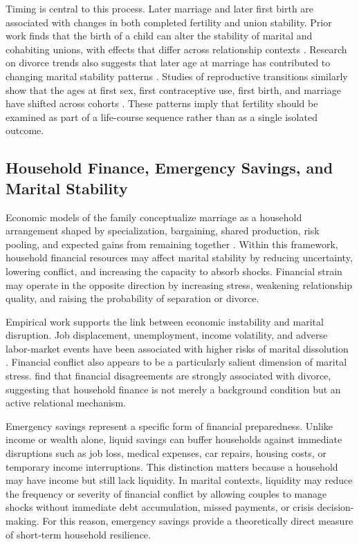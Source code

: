\documentclass[12pt]{article}
\begin{document}
Timing is central to this process. Later marriage and later first birth are associated with changes in both completed fertility and union stability. Prior work finds that the birth of a child can alter the stability of marital and cohabiting unions, with effects that differ across relationship contexts \citep{musick2015}. Research on divorce trends also suggests that later age at marriage has contributed to changing marital stability patterns \citep{rotz2016}. Studies of reproductive transitions similarly show that the ages at first sex, first contraceptive use, first birth, and marriage have shifted across cohorts \citep{finer2014}. These patterns imply that fertility should be examined as part of a life-course sequence rather than as a single isolated outcome.

\subsection{Household Finance, Emergency Savings, and Marital Stability}

Economic models of the family conceptualize marriage as a household arrangement shaped by specialization, bargaining, shared production, risk pooling, and expected gains from remaining together \citep{becker1981}. Within this framework, household financial resources may affect marital stability by reducing uncertainty, lowering conflict, and increasing the capacity to absorb shocks. Financial strain may operate in the opposite direction by increasing stress, weakening relationship quality, and raising the probability of separation or divorce.

Empirical work supports the link between economic instability and marital disruption. Job displacement, unemployment, income volatility, and adverse labor-market events have been associated with higher risks of marital dissolution \citep{charles2004,hansen2005,nunley2010,keldenich2022}. Financial conflict also appears to be a particularly salient dimension of marital stress. \citet{dew2012} find that financial disagreements are strongly associated with divorce, suggesting that household finance is not merely a background condition but an active relational mechanism.

Emergency savings represent a specific form of financial preparedness. Unlike income or wealth alone, liquid savings can buffer households against immediate disruptions such as job loss, medical expenses, car repairs, housing costs, or temporary income interruptions. This distinction matters because a household may have income but still lack liquidity. In marital contexts, liquidity may reduce the frequency or severity of financial conflict by allowing couples to manage shocks without immediate debt accumulation, missed payments, or crisis decision-making. For this reason, emergency savings provide a theoretically direct measure of short-term household resilience.
\end{document}
